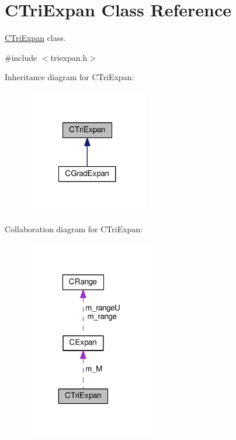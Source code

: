 \hypertarget{classCTriExpan}{\section{C\-Tri\-Expan Class Reference}
\label{classCTriExpan}
}


\hyperlink{classCTriExpan}{C\-Tri\-Expan} class.  




{\ttfamily \#include $<$triexpan.\-h$>$}



Inheritance diagram for C\-Tri\-Expan\-:\nopagebreak
\begin{figure}[H]
\begin{center}
\leavevmode
\includegraphics[width=152pt]{classCTriExpan__inherit__graph}
\end{center}
\end{figure}


Collaboration diagram for C\-Tri\-Expan\-:\nopagebreak
\begin{figure}[H]
\begin{center}
\leavevmode
\includegraphics[width=160pt]{classCTriExpan__coll__graph}
\end{center}
\end{figure}
